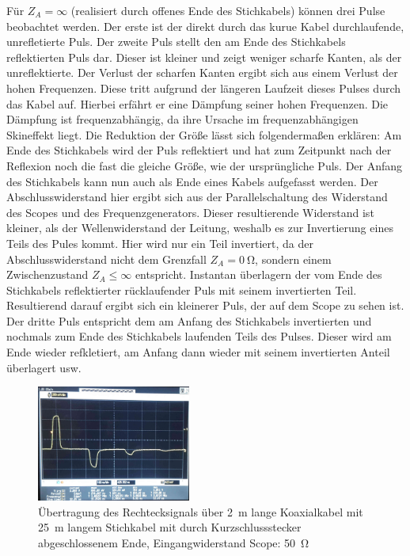 \documentclass[a4paper,twoside,final]{article}
\begin{document}
Für \textbf{$Z_A = \infty$} (realisiert durch offenes Ende des Stichkabels) können drei Pulse beobachtet werden. Der erste ist der direkt durch das kurue Kabel durchlaufende, unrefletierte Puls. Der zweite Puls stellt den am Ende des Stichkabels reflektierten Puls dar. Dieser ist kleiner und zeigt weniger scharfe Kanten, als der unreflektierte. Der Verlust der scharfen Kanten ergibt sich aus einem Verlust der hohen Frequenzen. Diese tritt aufgrund der längeren Laufzeit dieses Pulses durch das Kabel auf. Hierbei erfährt er eine Dämpfung seiner hohen Frequenzen. Die Dämpfung ist frequenzabhängig, da ihre Ursache im frequenzabhängigen Skineffekt liegt. Die Reduktion der Größe lässt sich folgendermaßen erklären: Am Ende des Stichkabels wird der Puls reflektiert und hat zum Zeitpunkt nach der Reflexion noch die fast die gleiche Größe, wie der ursprüngliche Puls. Der Anfang des Stichkabels kann nun auch als Ende eines Kabels aufgefasst werden. Der Abschlusswiderstand hier ergibt sich aus der Parallelschaltung des Widerstand des Scopes und des Frequenzgenerators. Dieser resultierende Widerstand ist kleiner, als der Wellenwiderstand der Leitung, weshalb es zur Invertierung eines Teils des Pules kommt. Hier wird nur ein Teil invertiert, da der Abschlusswiderstand nicht dem Grenzfall $Z_A = \SI{0}{\ohm}$, sondern einem Zwischenzustand $Z_A \leq \infty$ entspricht. Instantan überlagern der vom Ende des Stichkabels reflektierter rücklaufender Puls mit seinem invertierten Teil. Resultierend darauf ergibt sich ein kleinerer Puls, der auf dem Scope zu sehen ist. Der dritte Puls entspricht dem am Anfang des Stichkabels invertierten und nochmals zum Ende des Stichkabels laufenden Teils des Pulses. Dieser wird am Ende wieder refkletiert, am Anfang dann wieder mit seinem invertierten Anteil überlagert usw. \\


\begin{figure}[htp]
    \centering
        \includegraphics[width=0.45\textwidth]{Bilder/Bild5.jpg}
    \caption{Übertragung des Rechtecksignals über \SI{2}{\meter} lange Koaxialkabel mit \SI{25}{\meter} langem Stichkabel mit durch Kurzschlussstecker abgeschlossenem Ende, Eingangwiderstand Scope: \SI{50}{\ohm}}
\end{figure}
\end{document}
